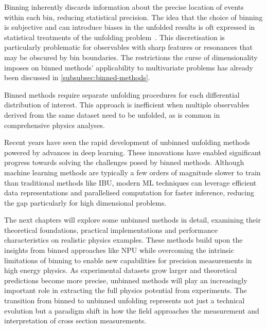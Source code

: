     Binning inherently discards information about the precise location of events within each bin, reducing statistical precision.
    The idea that the choice of binning is subjective and can introduce biases in the unfolded results is oft expressed in statistical treatments of the unfolding problem~\cite{cowan_survey_2002, cowan_statistics_2021, CowanStatisticalRehovot, Cowan2011AsymptoticPhysics,Tang2017DataMethod, hocker_svd_1996, Gagunashvili2024DataOptimization, CranmerPracticalLHC, StatisticalPhysics, Bohm2025IntroductionPhysicists, gardi_statistics_2015, Adam-Bourdarios2015TheChallenge, cowan_topics_2010}.
    This discretisation is particularly problematic for observables with sharp features or resonances that may be obscured by bin boundaries.
    The restrictions the curse of dimensionality imposes on binned methods' applicability to multivariate problems has already been discussed in \cref{subsubsec:binned-methods}.

    Binned methods require separate unfolding procedures for each differential distribution of interest.
    This approach is inefficient when multiple observables derived from the same dataset need to be unfolded, as is common in comprehensive physics analyses.
    
    Recent years have seen the rapid development of unbinned unfolding methods powered by advances in deep learning.
    These innovations have enabled significant progress towards solving the challenges posed by binned methods.
    Although machine learning methods are typically a few orders of magnitude slower to train than traditional methods like IBU, modern ML techniques can leverage efficient data representations and parallelised computation for faster inference, reducing the gap particularly for high dimensional problems.

    The next chapters will explore some unbinned methods in detail, examining their theoretical foundations, practical implementations and performance characteristics on realistic physics examples.
    These methods build upon the insights from binned approaches like NPU while overcoming the intrinsic limitations of binning to enable new capabilities for precision measurements in high energy physics.
    As experimental datasets grow larger and theoretical predictions become more precise, unbinned methods will play an increasingly important role in extracting the full physics potential from experiments.
    The transition from binned to unbinned unfolding represents not just a technical evolution but a paradigm shift in how the field approaches the measurement and interpretation of cross section measurements.